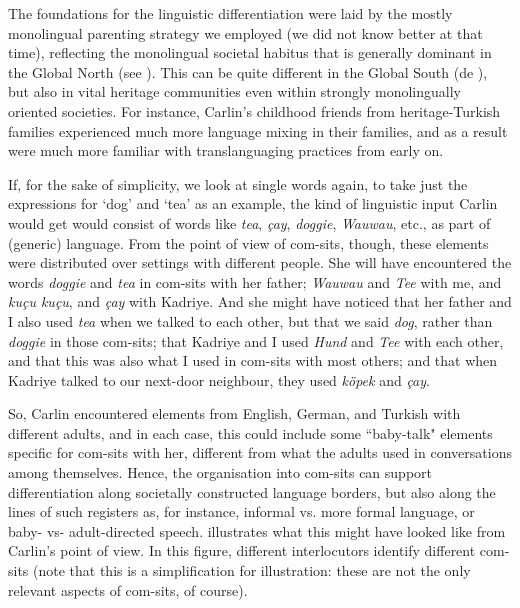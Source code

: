 The foundations for the linguistic differentiation were laid by the mostly monolingual parenting strategy we employed (we did not know better at that time), reflecting the monolingual societal habitus that is generally dominant in the Global North (see \citealt{Fuller2018}). This can be quite different in the Global South (de \citealt{DeHouwer2021}), but also in vital heritage communities even within strongly monolingually oriented societies. For instance, Carlin’s childhood friends from heritage-Turkish families experienced much more language mixing in their families, and as a result were much more familiar with translanguaging practices from early on.

If, for the sake of simplicity, we look at single words again, to take just the expressions for ‘dog’ and ‘tea’ as an example, the kind of linguistic input Carlin would get would consist of words like \textit{tea}, \textit{çay}, \textit{doggie}, \textit{Wauwau}, etc., as part of (generic) language. From the point of view of com-sits, though, these elements were distributed over settings with different people. She will have encountered the words \textit{doggie} and \textit{tea} in com-sits with her father; \textit{Wauwau} and \textit{Tee} with me, and \textit{kuçu kuçu}, and \textit{çay} with Kadriye. And she might have noticed that her father and I also used \textit{tea} when we talked to each other, but that we said \textit{dog}, rather than \textit{doggie} in those com-sits; that Kadriye and I used \textit{Hund} and \textit{Tee} with each other, and that this was also what I used in com-sits with most others; and that when Kadriye talked to our next-door neighbour, they used \textit{köpek} and \textit{çay}.

So, Carlin encountered elements from English, German, and Turkish with different adults, and in each case, this could include some “baby-talk" elements specific for com-sits with her, different from what the adults used in conversations among themselves. Hence, the organisation into com-sits can support differentiation along societally constructed language borders, but also along the lines of such registers as, for instance, informal vs. more formal language, or baby- vs- adult-directed speech.  illustrates what this might have looked like from Carlin’s point of view. In this figure, different interlocutors identify different com-sits (note that this is a simplification for illustration: these are not the only relevant aspects of com-sits, of course).

